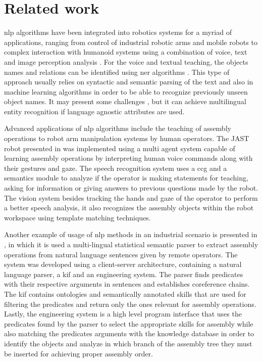 \section{Related work}\label{sec:related-work}

\gls{nlp} algorithms have been integrated into robotics systems for a myriad of applications, ranging from control of industrial robotic arms \cite{Akan2011,Watanabe2006} and mobile robots \cite{Matuszek2013} to complex interaction with humanoid systems using a combination of voice, text and image perception analysis \cite{Neo2008,Barabas2012}. For the voice and textual teaching, the objects names and relations can be identified using \gls{ner} algorithms \cite{Leon2014,Dlugolinsky2013}. This type of approach usually relies on syntactic and semantic parsing of the text and also in machine learning algorithms \cite{Ekbal2012} in order to be able to recognize previously unseen object names. It may present some challenges \cite{Ratinov2009}, but it can achieve multilingual entity recognition \cite{Rami2014} if language agnostic attributes are used.

Advanced applications of \gls{nlp} algorithms include the teaching of assembly operations to robot arm manipulation systems by human operators. The JAST robot presented in \cite{Rickert2007} was implemented using a multi agent system capable of learning assembly operations by interpreting human voice commands along with their gestures and gaze. The speech recognition system uses a \gls{ccg} and a semantics module to analyze if the operator is making statements for teaching, asking for information or giving answers to previous questions made by the robot. The vision system besides tracking the hands and gaze of the operator to perform a better speech analysis, it also recognizes the assembly objects within the robot workspace using template matching techniques.

Another example of usage of \gls{nlp} methods in an industrial scenario is presented in \cite{Stenmark2013}, in which it is used a multi-lingual statistical semantic parser to extract assembly operations from natural language sentences given by remote operators. The system was developed using a client-server architecture, containing a natural language parser, a \gls{kif} and an engineering system. The parser finds predicates with their respective arguments in sentences and establishes coreference chains. The \gls{kif} contains ontologies and semantically annotated skills that are used for filtering the predicates and return only the ones relevant for assembly operations. Lastly, the engineering system is a high level program interface that uses the predicates found by the parser to select the appropriate skills for assembly while also matching the predicates arguments with the knowledge database in order to identify the objects and analyze in which branch of the assembly tree they must be inserted for achieving proper assembly order.

